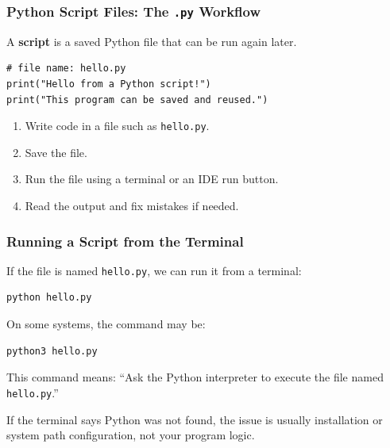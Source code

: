 \documentclass[aspectratio=169,10pt]{beamer}
\newcommand{\keyword}[1]{\textcolor{PrimaryBlue}{\textbf{#1}}}
\begin{document}
\begin{frame}[fragile]
\frametitle{Python Script Files: The \texttt{.py} Workflow}
\vspace{0.4cm}
A \keyword{script} is a saved Python file that can be run again later.
\begin{lstlisting}[style=pycodelarge]
# file name: hello.py
print("Hello from a Python script!")
print("This program can be saved and reused.")
\end{lstlisting}
\vspace{0.2cm}
\begin{tcolorbox}[lecturebox,title=Script workflow]
\begin{enumerate}\setlength\itemsep{0.11cm}
  \item Write code in a file such as \texttt{hello.py}.
  \item Save the file.
  \item Run the file using a terminal or an IDE run button.
  \item Read the output and fix mistakes if needed.
\end{enumerate}
\end{tcolorbox}
\end{frame}


\begin{frame}[fragile]
\frametitle{Running a Script from the Terminal}
\vspace{0.25cm}
If the file is named \texttt{hello.py}, we can run it from a terminal:
\begin{lstlisting}[style=termcode]
python hello.py
\end{lstlisting}
On some systems, the command may be:
\begin{lstlisting}[style=termcode]
python3 hello.py
\end{lstlisting}
\vspace{0.1cm}
\begin{tcolorbox}[lecturebox,title=Beginner interpretation]
This command means: ``Ask the Python interpreter to execute the file named \texttt{hello.py}.''
\end{tcolorbox}
\begin{tcolorbox}[lecturebox,title=Checkpoint]
If the terminal says Python was not found, the issue is usually installation or system path configuration, not your program logic.
\end{tcolorbox}
\end{frame}
\end{document}
